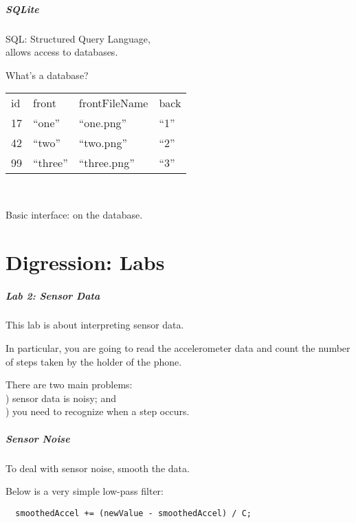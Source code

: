 \begin{frame}
\frametitle{SQLite}

\begin{changemargin}{1cm}
SQL: Structured Query Language, \\
allows access to databases.

What's a database?

\begin{center}
\begin{tabular}{l|l|l|l}
id & front & frontFileName & back \\
17 & ``one'' & ``one.png'' & ``1'' \\
42 & ``two'' & ``two.png'' & ``2'' \\
99 & ``three'' & ``three.png'' & ``3'' \\
\end{tabular}
\end{center}
~

Basic interface:  on the database.

\end{changemargin}

\end{frame}

\part{Digression: Labs}
\frame{\partpage}


\begin{frame}
\frametitle{Lab 2: Sensor Data}
\begin{changemargin}{1cm}
This lab is about interpreting sensor data.

In particular, you are going to
read the accelerometer data and count the number of steps taken by the holder
of the phone. 

There are two main problems:\\
) sensor data is noisy; and\\
) you need
to recognize when a step occurs.
\end{changemargin}
\end{frame}

\begin{frame}[fragile]
\frametitle{Sensor Noise}
\begin{changemargin}{1cm}


To deal with sensor noise, smooth the data.

Below is a very simple low-pass filter:

\begin{lstlisting}
  smoothedAccel += (newValue - smoothedAccel) / C;
\end{lstlisting}

\end{changemargin}
\end{frame}

